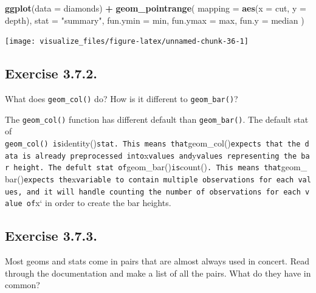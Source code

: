 \documentclass[]{book}
\newenvironment{Shaded}{\begin{snugshade}}{\end{snugshade}}
\newcommand{\DataTypeTok}[1]{\textcolor[rgb]{0.13,0.29,0.53}{#1}}
\newcommand{\KeywordTok}[1]{\textcolor[rgb]{0.13,0.29,0.53}{\textbf{#1}}}
\newcommand{\NormalTok}[1]{#1}
\newcommand{\OperatorTok}[1]{\textcolor[rgb]{0.81,0.36,0.00}{\textbf{#1}}}
\newcommand{\StringTok}[1]{\textcolor[rgb]{0.31,0.60,0.02}{#1}}
\theoremstyle{plain}
\theoremstyle{remark}
\begin{document}
\begin{Shaded}
\begin{Highlighting}[]
\KeywordTok{ggplot}\NormalTok{(}\DataTypeTok{data =}\NormalTok{ diamonds) }\OperatorTok{+}
\StringTok{  }\KeywordTok{geom_pointrange}\NormalTok{(}
    \DataTypeTok{mapping =} \KeywordTok{aes}\NormalTok{(}\DataTypeTok{x =}\NormalTok{ cut, }\DataTypeTok{y =}\NormalTok{ depth),}
    \DataTypeTok{stat =} \StringTok{"summary"}\NormalTok{,}
    \DataTypeTok{fun.ymin =}\NormalTok{ min,}
    \DataTypeTok{fun.ymax =}\NormalTok{ max,}
    \DataTypeTok{fun.y =}\NormalTok{ median}
\NormalTok{  )}
\end{Highlighting}
\end{Shaded}

\begin{center}\texttt{[image: visualize\_files/figure-latex/unnamed-chunk-36-1]} \end{center}

\hypertarget{exercise-3.7.2.}{%
\subsection*{\texorpdfstring{Exercise {3.7.2}.}{Exercise 3.7.2.}}\label{exercise-3.7.2.}}

What does \texttt{geom\_col()} do? How is it different to \texttt{geom\_bar()}?

The \texttt{geom\_col()} function has different default than \texttt{geom\_bar()}.
The default stat of \texttt{geom\_col()\ is}identity()\texttt{stat.\ This\ means\ that}geom\_col()\texttt{expects\ that\ the\ data\ is\ already\ preprocessed\ into}x\texttt{values\ and}y\texttt{values\ representing\ the\ bar\ height.\ The\ defult\ stat\ of}geom\_bar()\texttt{is}count()\texttt{.\ This\ means\ that}geom\_bar()\texttt{expects\ the}x\texttt{variable\ to\ contain\ multiple\ observations\ for\ each\ values,\ and\ it\ will\ handle\ counting\ the\ number\ of\ observations\ for\ each\ value\ of}x` in order to create the bar heights.

\hypertarget{exercise-3.7.3.}{%
\subsection*{\texorpdfstring{Exercise {3.7.3}.}{Exercise 3.7.3.}}\label{exercise-3.7.3.}}

Most geoms and stats come in pairs that are almost always used in concert.
Read through the documentation and make a list of all the pairs.
What do they have in common?
\end{document}
